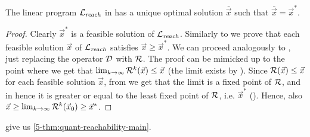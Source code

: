 \begin{lemma}
	\label{5-lem:quant-reach-lp}
	The linear program $\mathcal{L}_{\mathit{reach}}$ in  has a unique optimal solution 
	$\bar{\vec{x}}$ such that $\bar{\vec{x}} = \vec{x}^*$.
\end{lemma}
\begin{proof}
Clearly $\vec{x}^*$ is a feasible solution of $\mathcal{L}_{\mathit{reach}}$. Similarly to  we prove that each feasible solution $\vec{x}$ of $\mathcal{L}_{\mathit{reach}}$ satisfies $\vec{x}\geq \vec{x}^*$. We can proceed analogously  to , just replacing the operator $\mathcal{D}$ with $\mathcal{R}$. The proof can be mimicked up to the point where we get that $\lim_{k\rightarrow \infty} \mathcal{R}^k (\vec{x}) \leq \vec{x}$ (the limit exists by ). Since $\mathcal{R}(\vec{x})\leq \vec{x}$ for each feasible solution $\vec{x}$, from  we get that the limit is a fixed point of $\mathcal{R}$, and in hence it is greater or equal to the least fixed point of $\mathcal{R}$, i.e. $\vec{x}^*$ (). Hence, also $\vec{x} \geq \lim_{k\rightarrow \infty} \mathcal{R}^k (\vec{x}_0)\geq \vec{x}^*$. 
\end{proof}

\noindent
{} give us \cref{5-thm:quant-reachability-main}.
